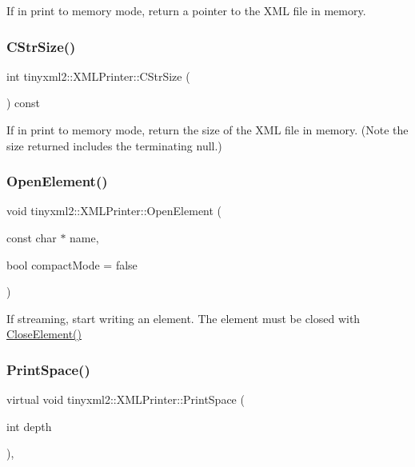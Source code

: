 If in print to memory mode, return a pointer to the X\+ML file in memory. \mbox{\label{classtinyxml2_1_1XMLPrinter_a3256cf3523d4898b91abb18b924be04c}} 
\subsubsection{\texorpdfstring{CStrSize()}{CStrSize()}}
{\footnotesize\ttfamily int tinyxml2\+::\+X\+M\+L\+Printer\+::\+C\+Str\+Size (\begin{DoxyParamCaption}{ }\end{DoxyParamCaption}) const\hspace{0.3cm}{\ttfamily [inline]}}

If in print to memory mode, return the size of the X\+ML file in memory. (Note the size returned includes the terminating null.) \mbox{\label{classtinyxml2_1_1XMLPrinter_a20fb06c83bd13e5140d7dd13af06c010}} 
\subsubsection{\texorpdfstring{OpenElement()}{OpenElement()}}
{\footnotesize\ttfamily void tinyxml2\+::\+X\+M\+L\+Printer\+::\+Open\+Element (\begin{DoxyParamCaption}\item[{const char $\ast$}]{name,  }\item[{bool}]{compact\+Mode = {\ttfamily false} }\end{DoxyParamCaption})}

If streaming, start writing an element. The element must be closed with \mbox{\hyperlink{classtinyxml2_1_1XMLPrinter_ad04d29562b46fcdb23ab320f8b664240}{Close\+Element()}} \mbox{\label{classtinyxml2_1_1XMLPrinter_a01148e2ebe6776e38c5a3e41bc5feb74}} 
\subsubsection{\texorpdfstring{PrintSpace()}{PrintSpace()}}
{\footnotesize\ttfamily virtual void tinyxml2\+::\+X\+M\+L\+Printer\+::\+Print\+Space (\begin{DoxyParamCaption}\item[{int}]{depth }\end{DoxyParamCaption})\hspace{0.3cm}{\ttfamily [protected]}, {\ttfamily [virtual]}}


